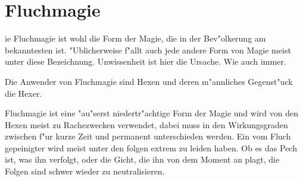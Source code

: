 \section{Fluchmagie} \label{fluchmagie}
ie Fluchmagie ist wohl die Form der Magie, 
die in der Bev"olkerung am bekanntesten ist. "Ublicherweise f"allt auch jede andere Form von Magie 
meist unter diese Bezeichnung. Unwissenheit ist hier die Ursache. Wie auch immer.
\par Die Anwender von Fluchmagie sind Hexen und deren m"annliches Gegenst"uck die Hexer.
\par Fluchmagie ist eine "au"serst niedertr"achtige Form der Magie und wird von den Hexen meist zu 
Rachezwecken verwendet, dabei muss in den Wirkungsgraden zwischen \glqq f"ur kurze Zeit\grqq{} und 
permanent unterschieden werden. Ein vom Fluch gepeinigter wird meist unter den folgen extrem zu 
leiden haben. Ob es das Pech ist, was ihn verfolgt, oder die Gicht, die ihn von dem Moment an plagt, 
die Folgen sind schwer wieder zu neutralisieren.
